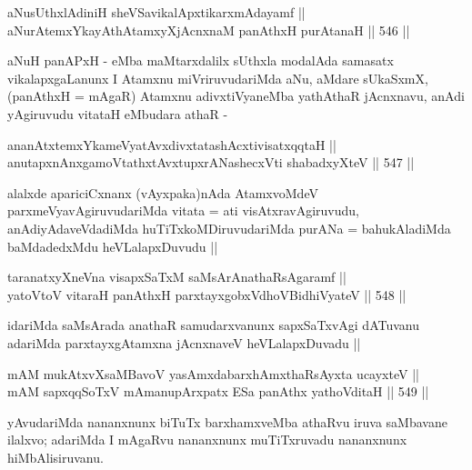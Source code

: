 
\begin{shl}
aNusUthxlAdiniH sheVSavikalApxtikarxmAdayamf || \\
aNurAtemxYkayAthAtamxyXjAcnxnaM panAthxH purAtanaH ||  546 ||  
\end{shl}

\begin{artha}
aNuH panAPxH - eMba maMtarxdalilx sUthxla modalAda samasatx
vikalapxgaLanunx I Atamxnu miVriruvudariMda aNu, aMdare sUkaSxmX,
(panAthxH = mAgaR) Atamxnu adivxtiVyaneMba yathAthaR jAcnxnavu, anAdi
yAgiruvudu vitataH eMbudara athaR -
\end{artha}

\begin{shl}
ananAtxtemxYkameVyatAvxdivxtatashAcxtivisatxqqtaH || \\
anutapxnAnxgamoVtathxtAvxtupxrANashecxVti shabadxyXteV ||  547 ||  
\end{shl}

\begin{artha}
alalxde apariciCxnanx (vAyxpaka)nAda AtamxvoMdeV
parxmeVyavAgiruvudariMda vitata = ati visAtxravAgiruvudu,
anAdiyAdaveVdadiMda huTiTxkoMDiruvudariMda purANa = bahukAladiMda
baMdadedxMdu heVLalapxDuvudu ||
\end{artha}


\begin{shl}
taranatxyXneVna visapxSaTxM saMsArAnathaRsAgaramf || \\
yatoV\s toV vitaraH panAthxH parxtayxgobxVdhoV\s BidhiVyateV ||  548 ||  
\end{shl}

\begin{artha}
idariMda saMsArada anathaR samudarxvanunx sapxSaTxvAgi dATuvanu
adariMda parxtayxgAtamxna jAcnxnaveV heVLalapxDuvadu ||
\end{artha}

\begin{shl}
mAM mukAtxvX\s saMBavoV yasAmxdabarxhAmxthaRsAyxta ucayxteV || \\
mAM sapxqqSoTxV mAmanupArxpatx ESa panAthx yathoVditaH ||  549 ||  
\end{shl}

\begin{artha}
yAvudariMda nananxnunx biTuTx barxhamxveMba athaRvu iruva saMbavane
ilalxvo; adariMda I mAgaRvu nananxnunx muTiTxruvadu nananxnunx hiMbAlisiruvanu.
\end{artha}

